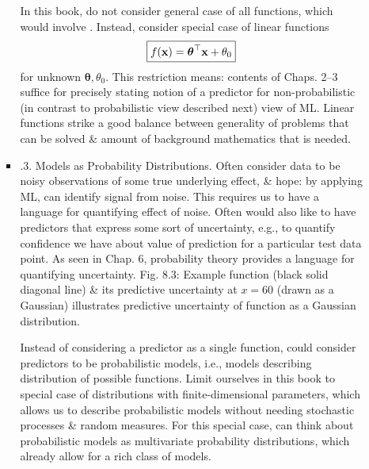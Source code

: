 \documentclass{article}
\begin{document}
\begin{itemize}
\begin{itemize}
\begin{itemize}
			In this book, do not consider general case of all functions, which would involve . Instead, consider special case of linear functions
			\begin{equation}
				\boxed{f({\bf x}) = \boldsymbol{\theta}^\top{\bf x} + \theta_0}
			\end{equation}
			for unknown $\boldsymbol{\theta},\theta_0$. This restriction means: contents of Chaps. 2--3 suffice for precisely stating notion of a predictor for non-probabilistic (in contrast to probabilistic view described next) view of ML. Linear functions strike a good balance between generality of problems that can be solved \& amount of background mathematics that is needed.
			\item {.3. Models as Probability Distributions.} Often consider data to be noisy observations of some true underlying effect, \& hope: by applying ML, can identify signal from noise. This requires us to have a language for quantifying effect of noise. Often would also like to have predictors that express some sort of uncertainty, e.g., to quantify confidence we have about value of prediction for a particular test data point. As seen in Chap. 6, probability theory provides a language for quantifying uncertainty. {\sf Fig. 8.3: Example function (black solid diagonal line) \& its predictive uncertainty at $x = 60$ (drawn as a Gaussian)} illustrates predictive uncertainty of function as a Gaussian distribution.
			
			Instead of considering a predictor as a single function, could consider predictors to be probabilistic models, i.e., models describing distribution of possible functions. Limit ourselves in this book to special case of distributions with finite-dimensional parameters, which allows us to describe probabilistic models without needing stochastic processes \& random measures. For this special case, can think about probabilistic models as multivariate probability distributions, which already allow for a rich class of models.
			

\end{itemize}
\end{itemize}
\end{itemize}
\end{document}
